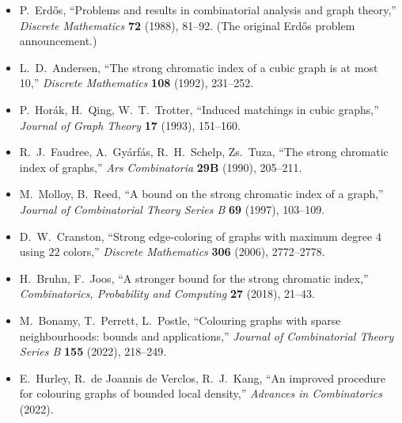 \documentclass[11pt]{article}
\begin{document}
\begin{itemize}[leftmargin=*, itemsep=2pt]
  \item P.\ Erd\H{o}s, ``Problems and results in combinatorial
        analysis and graph theory,'' \emph{Discrete Mathematics}
        \textbf{72} (1988), 81--92. (The original Erd\H{o}s problem
        announcement.)
  \item L.\ D.\ Andersen, ``The strong chromatic index of a cubic
        graph is at most 10,'' \emph{Discrete Mathematics}
        \textbf{108} (1992), 231--252.
  \item P.\ Hor\'ak, H.\ Qing, W.\ T.\ Trotter, ``Induced matchings
        in cubic graphs,'' \emph{Journal of Graph Theory}
        \textbf{17} (1993), 151--160.
  \item R.\ J.\ Faudree, A.\ Gy\'arf\'as, R.\ H.\ Schelp, Zs.\ Tuza,
        ``The strong chromatic index of graphs,''
        \emph{Ars Combinatoria} \textbf{29B} (1990), 205--211.
  \item M.\ Molloy, B.\ Reed, ``A bound on the strong chromatic
        index of a graph,'' \emph{Journal of Combinatorial Theory
        Series B} \textbf{69} (1997), 103--109.
  \item D.\ W.\ Cranston, ``Strong edge-coloring of graphs with
        maximum degree $4$ using $22$ colors,'' \emph{Discrete
        Mathematics} \textbf{306} (2006), 2772--2778.
  \item H.\ Bruhn, F.\ Joos, ``A stronger bound for the strong
        chromatic index,'' \emph{Combinatorics, Probability and
        Computing} \textbf{27} (2018), 21--43.
  \item M.\ Bonamy, T.\ Perrett, L.\ Postle, ``Colouring graphs with
        sparse neighbourhoods: bounds and applications,''
        \emph{Journal of Combinatorial Theory Series B}
        \textbf{155} (2022), 218--249.
  \item E.\ Hurley, R.\ de Joannis de Verclos, R.\ J.\ Kang, ``An
        improved procedure for colouring graphs of bounded local
        density,'' \emph{Advances in Combinatorics} (2022).
\end{itemize}
\end{document}
